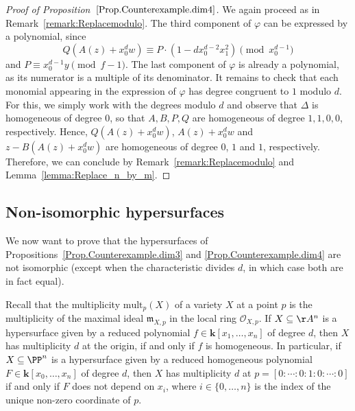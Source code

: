 \documentclass[JEP,XML,SOM,Unicode,NoFloatCountersInSection,published]{cedram}
\theoremstyle{definition}
\newcommand{\kk}{\mathbf{k}}
\begin{document}
\begin{proof}[Proof of Proposition~$\ref{Prop.Counterexample.dim4}$]
We again proceed as in Remark~\ref{remark:Replacemodulo}.
The third component of $\varphi$ can be expressed by a polynomial, since
\[
Q(A(z)+x_0^{d}w)\equiv P\cdot (1- d x_0^{d-2}x_1^2)\pmod{x_0^{d-1}}
\]
and $P\equiv x_0^{d-1}y\pmod{f-1}$.
The last component of $\varphi$ is already a polynomial, as its numerator is a multiple of its denominator. It remains to check that each monomial appearing in the expression of $\varphi$ has degree congruent to $1$ modulo $d$. For this, we simply work with the degrees modulo $d$ and observe that $\Delta$ is homogeneous of degree $0$, so that $A,B,P,Q$ are homogeneous of degree $1,1,0,0$, respectively.
Hence, $Q(A(z)+x_0^dw)$, $A(z) + x_0^d w$ and $z-B(A(z)+x_0^{d}w)$ are homogeneous of degree
$0$, $1$ and $1$, respectively.
Therefore, we can conclude by Remark~\ref{remark:Replacemodulo} and
Lemma~\ref{lemma:Replace_n_by_m}.
\end{proof}

\subsection{Non-isomorphic hypersurfaces}
\label{Subsec.Counter_examples}
We now want to prove that the hypersurfaces of Propositions~\ref{Prop.Counterexample.dim3} and \ref{Prop.Counterexample.dim4} are not isomorphic (except when the characteristic divides $d$, in which case both are in fact equal).

Recall that the multiplicity $\mathrm{mult}_p(X)$ of a variety $X$ at a point $p$ is the multiplicity of the maximal ideal $\mathfrak{m}_{X,p}$ in the local ring $\mathcal{O}_{X,p}$.
If $X \subseteq \AA^n$ is a hypersurface given by a reduced polynomial
$f \in \kk[x_1, \ldots, x_n]$ of degree $d$, then $X$ has multiplicity
$d$ at the origin, if and only if $f$ is homogeneous. In particular,
if $X \subseteq \PP^n$ is a hypersurface given by a reduced homogeneous polynomial
$F \in \kk[x_0, \ldots, x_n]$ of degree $d$, then $X$ has multiplicity $d$ at
$p = [0: \cdots : 0: 1 : 0 : \cdots : 0]$
if and only if $F$ does not depend on $x_i$, where $i \in \{0, \ldots, n\}$
is the index of the unique non-zero coordinate of $p$.
\end{document}
